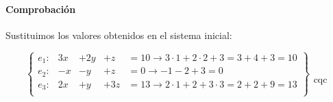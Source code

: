 \documentclass[palatino,nosec]{Docencia}
\begin{document}
\begin{problem}
\paragraph{Comprobación}

Sustituimos los valores obtenidos en el sistema inicial:


\[
\left\{\begin{array}{lcccl}
e_1: & 3x &+ 2y &+z &=10 \to 3·1+2·2+3 = 3+4+3 = 10  \\
e_2: & -x&-y&+z&=0 \to -1-2+3 = 0  \\
e_3: & 2x&+y&+3z&=13 \to 2·1+2+3·3 = 2+2+9 = 13  \\
\end{array}\right\} \begin{array}{c}\\\\\\\\\text{cqc}\end{array}
\]
\end{problem}
\end{document}
